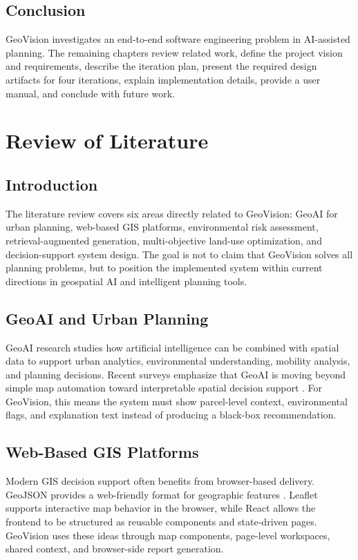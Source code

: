 \documentclass[12pt,a4paper,oneside]{report}
\begin{document}
\section{Conclusion}
GeoVision investigates an end-to-end software engineering problem in AI-assisted planning. The remaining chapters review related work, define the project vision and requirements, describe the iteration plan, present the required design artifacts for four iterations, explain implementation details, provide a user manual, and conclude with future work.

\chapter{Review of Literature}
\section{Introduction}
The literature review covers six areas directly related to GeoVision: GeoAI for urban planning, web-based GIS platforms, environmental risk assessment, retrieval-augmented generation, multi-objective land-use optimization, and decision-support system design. The goal is not to claim that GeoVision solves all planning problems, but to position the implemented system within current directions in geospatial AI and intelligent planning tools.

\section{GeoAI and Urban Planning}
GeoAI research studies how artificial intelligence can be combined with spatial data to support urban analytics, environmental understanding, mobility analysis, and planning decisions. Recent surveys emphasize that GeoAI is moving beyond simple map automation toward interpretable spatial decision support \cite{mai2025geoai}. For GeoVision, this means the system must show parcel-level context, environmental flags, and explanation text instead of producing a black-box recommendation.

\section{Web-Based GIS Platforms}
Modern GIS decision support often benefits from browser-based delivery. GeoJSON provides a web-friendly format for geographic features \cite{geojson2016}. Leaflet supports interactive map behavior in the browser, while React allows the frontend to be structured as reusable components and state-driven pages. GeoVision uses these ideas through map components, page-level workspaces, shared context, and browser-side report generation.
\end{document}
